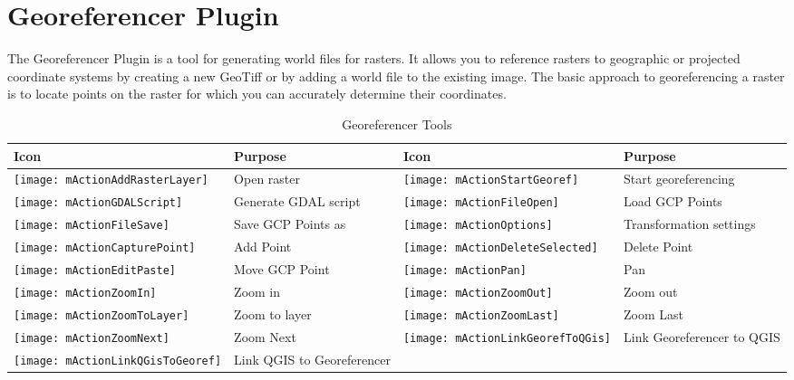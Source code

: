 
\section{Georeferencer Plugin}


The Georeferencer Plugin is a tool for generating world files for rasters.
It allows you to reference rasters to geographic or projected coordinate 
systems by creating a new GeoTiff or by adding a world file to the 
existing image. The basic approach to georeferencing a raster is to locate 
points on the raster for which you can accurately determine their coordinates. 


\begin{table}[h]
\begin{tabular}{|m{1cm}|m{6cm}|m{1cm}|m{6cm}|}
 \hline \textbf{Icon} & \textbf{Purpose} & \textbf{Icon} &
 \textbf{Purpose} \\
 \hline \texttt{[image: mActionAddRasterLayer]} & Open raster &
 \texttt{[image: mActionStartGeoref]} & Start georeferencing \\
 \hline \texttt{[image: mActionGDALScript]} & Generate GDAL script &
 \texttt{[image: mActionFileOpen]} & Load GCP Points \\
 \hline \texttt{[image: mActionFileSave]} & Save GCP Points as &
 \texttt{[image: mActionOptions]} & Transformation settings \\
 \hline \texttt{[image: mActionCapturePoint]} & Add Point &
 \texttt{[image: mActionDeleteSelected]} & Delete Point \\
 \hline \texttt{[image: mActionEditPaste]} & Move GCP Point &
 \texttt{[image: mActionPan]} & Pan \\
 \hline \texttt{[image: mActionZoomIn]} & Zoom in &
 \texttt{[image: mActionZoomOut]} & Zoom out \\
 \hline \texttt{[image: mActionZoomToLayer]} & Zoom to layer &
 \texttt{[image: mActionZoomLast]} & Zoom Last \\
 \hline \texttt{[image: mActionZoomNext]} & Zoom Next &
 \texttt{[image: mActionLinkGeorefToQGis]} & Link Georeferencer to QGIS \\
 \hline \texttt{[image: mActionLinkQGisToGeoref]} & Link QGIS to Georeferencer &
 &  \\
\hline
\end{tabular}
\caption{Georeferencer Tools}\label{tab:georeferencer_tools}
\end{table}


